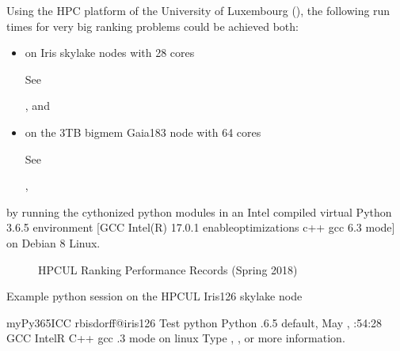 \documentclass[a4paper,10pt,english]{sphinxhowto}
\let\sphinxpxdimen\pdfpxdimen\else\newdimen\sphinxpxdimen
\begin{document}
Using the HPC platform of the University of Luxembourg (), the following run times for very big ranking problems could be achieved both:
\begin{itemize}
\item {} 
on Iris \sphinxhyphen{}skylake nodes with 28 cores %
\begin{footnote}[7]\sphinxAtStartFootnote
See 
%
\end{footnote}, and

\item {} 
on the 3TB \sphinxhyphen{}bigmem Gaia\sphinxhyphen{}183 node with 64 cores %
\begin{footnote}[8]\sphinxAtStartFootnote
See 
%
\end{footnote},

\end{itemize}

by running the cythonized python modules in an Intel compiled virtual Python 3.6.5 environment {[}GCC Intel(R) 17.0.1 \textendash{}enable\sphinxhyphen{}optimizations c++ gcc 6.3 mode{]} on Debian 8 Linux.

\begin{figure}[htbp]
\centering
\capstart

\noindent\sphinxincludegraphics[width=350\sphinxpxdimen]{{rankingRecords}.png}
\caption{HPC\sphinxhyphen{}UL Ranking Performance Records (Spring 2018)}\label{\detokenize{tutorial:id124}}\end{figure}

Example python session on the HPC\sphinxhyphen{}UL Iris\sphinxhyphen{}126 \sphinxhyphen{}skylake node \sphinxfootnotemark[7]

\begin{sphinxVerbatim}[commandchars=\\\{\},numbers=left,firstnumber=1,stepnumber=1]
myPy365ICC \PYG{o}{[}rbisdorff@iris\PYGZhy{}126 Test\PYG{o}{]}\PYGZdl{} python
Python .6.5 default, May   , :54:28
\PYG{o}{[}GCC IntelR C++ gcc .3 mode\PYG{o}{]} on linux
Type , ,  or   more information.
\PYGZgt{}\PYGZgt{}\PYGZgt{}
\end{sphinxVerbatim}
\end{document}

